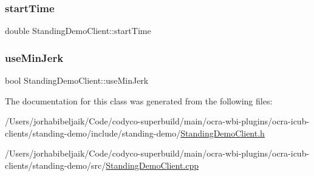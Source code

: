 \hypertarget{classStandingDemoClient_af05ac205216c20f9780f7e48a9ee4648}{}\label{classStandingDemoClient_af05ac205216c20f9780f7e48a9ee4648} 
\subsubsection{\texorpdfstring{start\+Time}{startTime}}
{\footnotesize\ttfamily double Standing\+Demo\+Client\+::start\+Time\hspace{0.3cm}{\ttfamily [private]}}

\hypertarget{classStandingDemoClient_a47132d5336d2e3b02085d2f153db6385}{}\label{classStandingDemoClient_a47132d5336d2e3b02085d2f153db6385} 
\subsubsection{\texorpdfstring{use\+Min\+Jerk}{useMinJerk}}
{\footnotesize\ttfamily bool Standing\+Demo\+Client\+::use\+Min\+Jerk\hspace{0.3cm}{\ttfamily [private]}}



The documentation for this class was generated from the following files\+:\begin{DoxyCompactItemize}
\item 
/\+Users/jorhabibeljaik/\+Code/codyco-\/superbuild/main/ocra-\/wbi-\/plugins/ocra-\/icub-\/clients/standing-\/demo/include/standing-\/demo/\hyperlink{StandingDemoClient_8h}{Standing\+Demo\+Client.\+h}\item 
/\+Users/jorhabibeljaik/\+Code/codyco-\/superbuild/main/ocra-\/wbi-\/plugins/ocra-\/icub-\/clients/standing-\/demo/src/\hyperlink{StandingDemoClient_8cpp}{Standing\+Demo\+Client.\+cpp}\end{DoxyCompactItemize}
